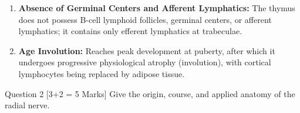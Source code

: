 \documentclass[11pt,a4paper]{article}
\begin{document}
\begin{ansbox}
\begin{enumerate}[leftmargin=*]
    \begin{itemize}
        \item Stains lightly eosinophilic due to a lower lymphocyte density and higher proportion of Epithelioreticular cells (Types IV, V, VI). Maturing T-cells undergo negative selection (elimination of autoreactive clones).
        \item \textbf{Hassall's Corpuscles (Thymic Corpuscles) --- Diagnostic Landmark:}
        \begin{itemize}
            \item Concentric, whorled arrangements of flattened, eosinophilic, degenerated Type VI epithelioreticular cells with central keratinization and calcification.
            \item Unique to the thymic medulla (not found in any other lymphoid organ).
        \end{itemize}
    \end{itemize}
    \item \textbf{Absence of Germinal Centers and Afferent Lymphatics:} The thymus does not possess B-cell lymphoid follicles, germinal centers, or afferent lymphatics; it contains only efferent lymphatics at trabeculae.
    \item \textbf{Age Involution:} Reaches peak development at puberty, after which it undergoes progressive physiological atrophy (involution), with cortical lymphocytes being replaced by adipose tissue.
\end{enumerate}
\end{ansbox}

\begin{qbox}{Question 2 [3+2 = 5 Marks]}
Give the origin, course, and applied anatomy of the radial nerve.
\end{qbox}
\end{document}

